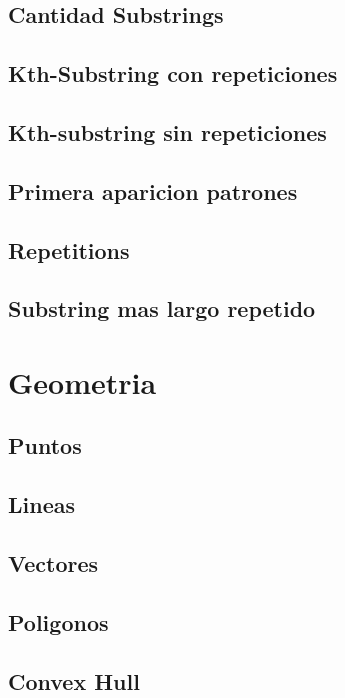 \subsection{Cantidad Substrings}
\raggedbottom
\hrulefill
\subsection{Kth-Substring con repeticiones}
\raggedbottom
\hrulefill
\subsection{Kth-substring sin repeticiones}
\raggedbottom
\hrulefill
\subsection{Primera aparicion patrones}
\raggedbottom
\hrulefill
\subsection{Repetitions}
\raggedbottom
\hrulefill
\subsection{Substring mas largo repetido}
\raggedbottom
\hrulefill

\section{Geometria}
\subsection{Puntos}
\raggedbottom
\hrulefill
\subsection{Lineas}
\raggedbottom
\hrulefill
\subsection{Vectores}
\raggedbottom
\hrulefill
\subsection{Poligonos}
\raggedbottom
\hrulefill
\subsection{Convex Hull}
\raggedbottom
\hrulefill

